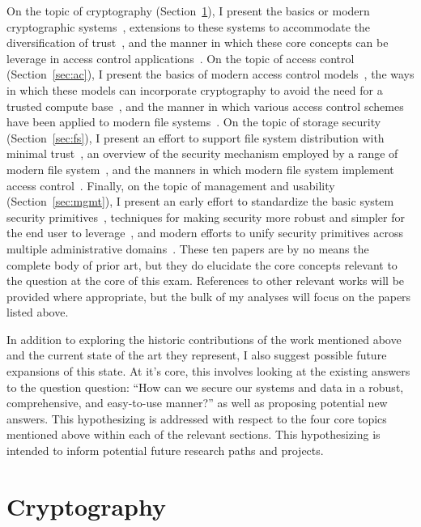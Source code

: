 \documentclass{sig-alternate}
\begin{document}
On the topic of cryptography (Section~\ref{sec:crypto}), I present the
basics or modern cryptographic systems~\cite{Diffie1976}, extensions
to these systems to accommodate the diversification of
trust~\cite{Shamir1979}, and the manner in which these core concepts
can be leverage in access control
applications~\cite{Bethencourt2007}. On the topic of access control
(Section~\ref{sec:ac}), I present the basics of modern access control
models~\cite{Sandhu1996}, the ways in which these models can
incorporate cryptography to avoid the need for a trusted compute
base~\cite{Bethencourt2007}, and the manner in which various access
control schemes have been applied to modern file
systems~\cite{Miltchev2008}. On the topic of storage security
(Section~\ref{sec:fs}), I present an effort to support file system
distribution with minimal trust~\cite{Mazieres1999}, an overview of
the security mechanism employed by a range of modern file
system~\cite{Kher2005}, and the manners in which modern file system
implement access control~\cite{Miltchev2008}. Finally, on the topic of
management and usability (Section~\ref{sec:mgmt}), I present an early
effort to standardize the basic system security
primitives~\cite{Samar1996}, techniques for making security more
robust and simpler for the end user to leverage~\cite{Cox2002}, and
modern efforts to unify security primitives across multiple
administrative domains~\cite{Morgan2004}. These ten papers are by no
means the complete body of prior art, but they do elucidate the core
concepts relevant to the question at the core of this exam. References
to other relevant works will be provided where appropriate, but the
bulk of my analyses will focus on the papers listed above.

In addition to exploring the historic contributions of the work
mentioned above and the current state of the art they represent, I
also suggest possible future expansions of this state. At it's core,
this involves looking at the existing answers to the question
question: ``How can we secure our systems and data in a robust,
comprehensive, and easy-to-use manner?'' as well as proposing
potential new answers. This hypothesizing is addressed with respect to
the four core topics mentioned above within each of the relevant
sections. This hypothesizing is intended to inform potential future
research paths and projects.

\section{Cryptography}
\label{sec:crypto}
\end{document}
